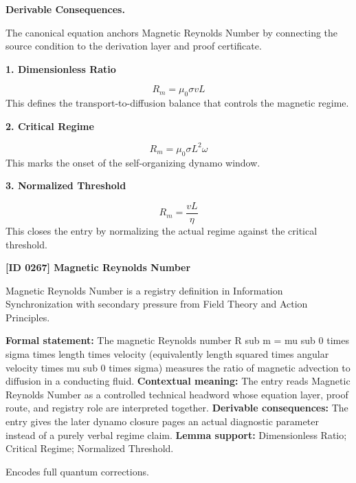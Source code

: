 \par\vspace{0.35em}
\noindent\textbf{Derivable Consequences.}\quad
\begingroup
\footnotesize
\raggedright
The canonical equation anchors Magnetic Reynolds Number by connecting the source condition to the derivation layer and proof certificate.
\par\endgroup

\noindent\textbf{1. Dimensionless Ratio}\par
\[
R_m=\mu_0\sigma vL
\]
\noindent This defines the transport-to-diffusion balance that controls the magnetic regime.\par
\noindent\textbf{2. Critical Regime}\par
\[
R_m=\mu_0\sigma L^2\omega
\]
\noindent This marks the onset of the self-organizing dynamo window.\par
\noindent\textbf{3. Normalized Threshold}\par
\[
R_m=\frac{vL}{\eta}
\]
\noindent This closes the entry by normalizing the actual regime against the critical threshold.\par

\clearpage
\noindent\textbf{[ID 0267] Magnetic Reynolds Number}\par
\vspace{0.35em}
\begingroup\small
{}
Magnetic Reynolds Number is a registry definition in Information Synchronization with secondary pressure from Field Theory and Action Principles.

\begingroup\footnotesize\setlength{\emergencystretch}{3em}\sloppy
\textbf{Formal statement:} The magnetic Reynolds number R sub m = mu sub 0 times sigma times length times velocity (equivalently length squared times angular velocity times mu sub 0 times sigma) measures the ratio of magnetic advection to diffusion in a conducting fluid. \textbf{Contextual meaning:} The entry reads Magnetic Reynolds Number as a controlled technical headword whose equation layer, proof route, and registry role are interpreted together. \textbf{Derivable consequences:} The entry gives the later dynamo closure pages an actual diagnostic parameter instead of a purely verbal regime claim. \textbf{Lemma support:} Dimensionless Ratio; Critical Regime; Normalized Threshold.\par
\endgroup

Encodes full quantum corrections.

